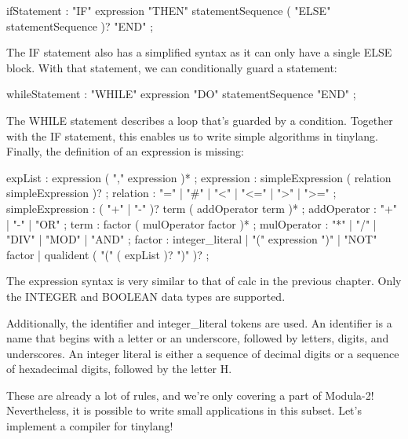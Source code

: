 \begin{shell}
ifStatement
    : "IF" expression "THEN" statementSequence
        ( "ELSE" statementSequence )? "END" ;
\end{shell}

The IF statement also has a simplified syntax as it can only have a single ELSE block. With that statement, we can conditionally guard a statement:

\begin{shell}
whileStatement
    : "WHILE" expression "DO" statementSequence "END" ;
\end{shell}

The WHILE statement describes a loop that’s guarded by a condition. Together with the IF statement, this enables us to write simple algorithms in tinylang. Finally, the definition of an expression is missing:

\begin{shell}
expList
    : expression ( "," expression )* ;
expression
    : simpleExpression ( relation simpleExpression )? ;
relation
    : "=" | "#" | "<" | "<=" | ">" | ">=" ;
simpleExpression
    : ( "+" | "-" )? term ( addOperator term )* ;
addOperator
    : "+" | "-" | "OR" ;
term
    : factor ( mulOperator factor )* ;
mulOperator
    : "*" | "/" | "DIV" | "MOD" | "AND" ;
factor
    : integer_literal | "(" expression ")" | "NOT" factor
    | qualident ( "(" ( expList )? ")" )? ;
\end{shell}

The expression syntax is very similar to that of calc in the previous chapter. Only the INTEGER and BOOLEAN data types are supported.

Additionally, the identifier and integer\_literal tokens are used. An identifier is a name that begins with a letter or an underscore, followed by letters, digits, and underscores. An integer literal is either a sequence of decimal digits or a sequence of hexadecimal digits, followed by the letter H.

These are already a lot of rules, and we’re only covering a part of Modula-2! Nevertheless, it is possible to write small applications in this subset. Let’s implement a compiler for tinylang!

























